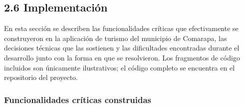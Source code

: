 

\subsection*{2.6 Implementación}

En esta sección se describen las funcionalidades críticas que
efectivamente se construyeron en la aplicación de turismo del municipio
de Comarapa, las decisiones técnicas que las sostienen y las
dificultades encontradas durante el desarrollo junto con la forma en que
se resolvieron. Los fragmentos de código incluidos son únicamente
ilustrativos; el código completo se encuentra en el repositorio del
proyecto.

\subsubsection*{Funcionalidades críticas construidas}


